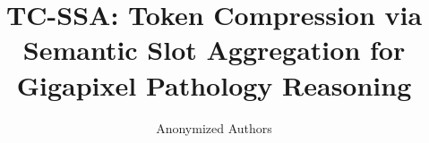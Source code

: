 \documentclass[runningheads]{llncs}
\begin{document}
%

\title{TC-SSA: Token Compression via Semantic Slot Aggregation for Gigapixel Pathology Reasoning}


%

\author{Anonymized Authors}  %
  
\end{document}
